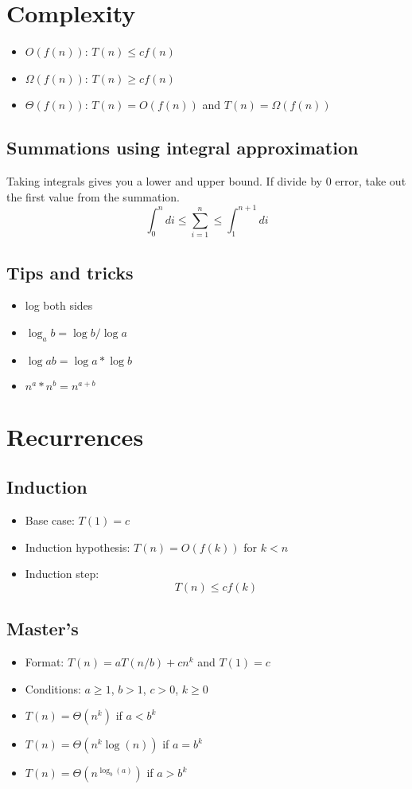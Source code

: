 \section{Complexity}
\begin{itemize}
    \item $O(f(n))$: $T(n) \leq cf(n)$
    \item $\Omega(f(n))$: $T(n) \geq cf(n)$
    \item $\Theta(f(n))$: $T(n) = O(f(n))$ and $T(n) = \Omega(f(n))$
\end{itemize}
\subsection{Summations using integral approximation}
Taking integrals gives you a lower and upper bound. If divide by 0 error, take out the first value from the summation.
$$\int_{0}^{n} di \leq \sum_{i=1}^{n} \leq \int_{1}^{n+1} di$$
\subsection{Tips and tricks}
\begin{itemize}
    \item log both sides
    \item $\log_ab = \log b / \log a$
    \item $\log {ab} = \log a * \log b$
    \item $n^{a} * n^{b} = n^{a+b}$
\end{itemize}


\section{Recurrences}

\subsection{Induction}
\begin{itemize}
    \item Base case: $T(1) = c$
    \item Induction hypothesis: $T(n) = O(f(k))$ for $k<n$
    \item Induction step:
    $$T(n)\leq cf(k)$$
\end{itemize}

\subsection{Master's}
\begin{itemize}
    \item Format: $T(n) = aT(n/b) + cn^k$ and $T(1) = c$
    \item Conditions: $a\geq 1$, $b>1$, $c>0$, $k\geq 0$
    \item $T(n) = \Theta(n^k)$ if $a < b^k$
    \item $T(n) = \Theta(n^k\log(n))$ if $a = b^k$
    \item $T(n) = \Theta(n^{\log_b(a)})$ if $a > b^k$
\end{itemize}

